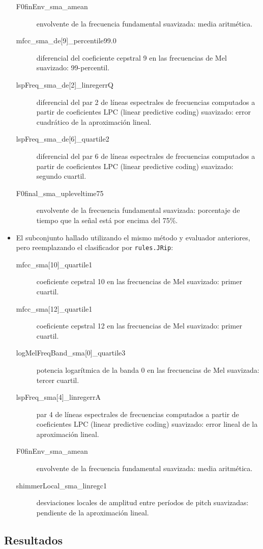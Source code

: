 \documentclass[10pt,a4paper]{article}
\begin{document}
\begin{itemize}
\begin{description}
    \item[F0finEnv\_sma\_amean] envolvente de la frecuencia fundamental suavizada: media aritmética.
    \item[mfcc\_sma\_de{[}9{]}\_percentile99.0] diferencial del coeficiente cepstral 9 en las frecuencias de Mel suavizado: 99-percentil.
    \item[lspFreq\_sma\_de{[}2{]}\_linregerrQ] diferencial del par 2 de líneas espectrales de frecuencias computados a partir de coeficientes LPC (linear predictive coding) suavizado: error cuadrático de la aproximación lineal.
    \item[lspFreq\_sma\_de{[}6{]}\_quartile2] diferencial del par 6 de líneas espectrales de frecuencias computados a partir de coeficientes LPC (linear predictive coding) suavizado: segundo cuartil.
    \item[F0final\_sma\_upleveltime75] envolvente de la frecuencia fundamental suavizada: porcentaje de tiempo que la señal está por encima del 75\%.
  \end{description}    
  
  \item El subconjunto hallado utilizando el mismo método y evaluador anteriores, pero reemplazando el clasificador por \texttt{rules.JRip}:
  \begin{description}
    \item[mfcc\_sma{[}10{]}\_quartile1] coeficiente cepstral 10 en las frecuencias de Mel suavizado: primer cuartil.
    \item[mfcc\_sma{[}12{]}\_quartile1] coeficiente cepstral 12 en las frecuencias de Mel suavizado: primer cuartil.
    \item[logMelFreqBand\_sma{[}0{]}\_quartile3] potencia logarítmica de la banda 0 en las frecuencias de Mel suavizada: tercer cuartil.
    \item[lspFreq\_sma{[}4{]}\_linregerrA] par 4 de líneas espectrales de frecuencias computados a partir de coeficientes LPC (linear predictive coding) suavizado: error lineal de la aproximación lineal.
    \item[F0finEnv\_sma\_amean] envolvente de la frecuencia fundamental suavizada: media aritmética.
    \item[shimmerLocal\_sma\_linregc1] desviaciones locales de amplitud entre períodos de pitch suavizadas: pendiente de la aproximación lineal.
  \end{description}  
\end{itemize}

\subsection{Resultados}
\end{document}
